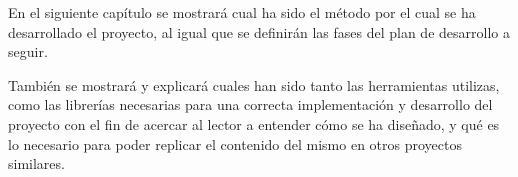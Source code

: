 En el siguiente capítulo se mostrará cual ha sido el método por el cual se ha desarrollado el proyecto, al igual que se definirán las fases del plan de desarrollo a seguir.

También se mostrará y explicará cuales han sido tanto las herramientas utilizas, como las librerías necesarias para una correcta implementación y desarrollo del proyecto con el fin de acercar al lector a entender cómo se ha diseñado, y qué es lo necesario para poder replicar el contenido del mismo en otros proyectos similares.

